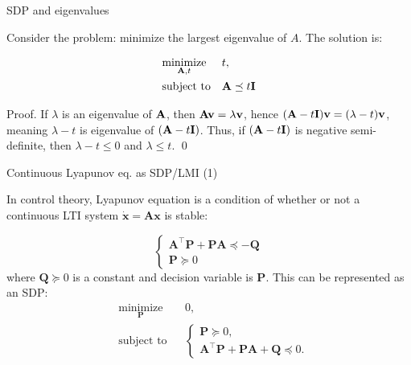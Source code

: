 \documentclass{beamer}
\begin{document}
\begin{frame}{SDP and eigenvalues}
	\begin{flushleft}
		
		Consider the problem: minimize the largest eigenvalue of $A$. The solution is:
		
		\begin{equation}
			\begin{aligned}
				& \underset{\mathbf{A}, t}{\text{minimize}}
				& & t, \\
				& \text{subject to}
				& & \mathbf{A} \preceq t\mathbf{I}
			\end{aligned}
		\end{equation}
		
		Proof. If $\lambda$ is an eigenvalue of $\mathbf{A}$, then $\mathbf{A} \mathbf{v} = \lambda\mathbf{v}$, hence $(\mathbf{A} - t\mathbf{I}) \mathbf{v} = (\lambda - t)\mathbf{v}$, meaning $\lambda - t$ is eigenvalue of $(\mathbf{A} - t\mathbf{I})$. Thus, if $(\mathbf{A} - t\mathbf{I})$ is negative semi-definite, then $\lambda - t \leq 0$ and $\lambda \leq t$. \qed
		
		
	\end{flushleft}
\end{frame}


\begin{frame}{Continuous Lyapunov eq. as SDP/LMI (1)}
\begin{flushleft}

In control theory, Lyapunov equation is a condition of whether or not a continuous LTI system $\dot{\mathbf{x}} = \mathbf{A}\mathbf{x}$ is stable:

\begin{equation}
    \begin{cases}
        \mathbf{A}^\top\mathbf{P} + \mathbf{P}\mathbf{A}  \preceq -\mathbf{Q} \\
        \mathbf{P} \succeq 0
    \end{cases}
\end{equation}
%
where $\mathbf{Q} \succeq 0$ is a constant and decision variable is $\mathbf{P}$. This can be represented as an SDP:
%
\begin{equation}
\begin{aligned}
& \underset{\mathbf{P}}{\text{minimize}}
& & 0, \\
& \text{subject to}
& & \begin{cases}
    \mathbf{P} \succeq 0, \\
    \mathbf{A}^\top\mathbf{P} + \mathbf{P}\mathbf{A} + \mathbf{Q} \preceq 0.
    \end{cases}
\end{aligned}
\end{equation}


\end{flushleft}
\end{frame}
\end{document}
